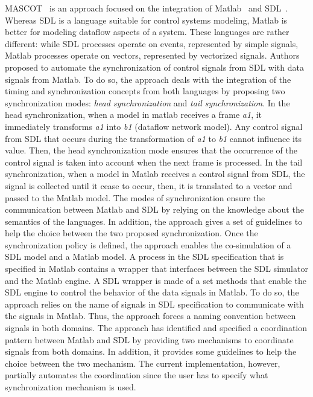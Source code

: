 MASCOT~\cite{mascotbib} is an approach focused on the integration of Matlab~\cite{matlabbib} and SDL~\cite{sdlbib}. Whereas SDL is a language suitable for control systems modeling, Matlab is better for modeling dataflow aspects of a system. These languages are rather different: while SDL processes operate on events, represented by simple signals, Matlab processes operate on vectors, represented by vectorized signals. Authors proposed to automate the synchronization of control signals from SDL with data signals from Matlab. To do so, the approach deals with the integration of the timing and synchronization concepts from both languages by proposing two synchronization modes: \emph{head synchronization} and \emph{tail synchronization}. In the head synchronization, when a model in matlab receives a frame \emph{a1}, it immediately transforms \emph{a1} into \emph{b1} (dataflow network model). Any control signal from SDL that occurs during the transformation of \emph{a1} to \emph{b1} cannot influence its value. Then, the head synchronization mode ensures that the occurrence of the control signal is taken into account when the next frame is processed. In the tail synchronization, when a model in Matlab receives a control signal from SDL, the signal is collected until it cease to occur, then, it is translated to a vector and passed to the Matlab model. The modes of synchronization ensure the communication between Matlab and SDL by relying on the knowledge about the semantics of the languages. In addition, the approach gives a set of guidelines to help the choice between the two proposed synchronization. Once the synchronization policy is defined, the approach enables the co-simulation of a SDL model and a Matlab model. A process in the SDL specification that is specified in Matlab contains a wrapper that interfaces between the SDL simulator and the Matlab engine. A SDL wrapper is made of a set methods that enable the SDL engine to control the behavior of the data signals in Matlab. To do so, the approach relies on the name of signals in SDL specification to communicate with the signals in Matlab. Thus, the approach forces a naming convention between signals in both domains. The approach has identified and specified a coordination pattern between Matlab and SDL by providing two mechanisms to coordinate signals from both domains. In addition, it provides some guidelines to help the choice between the two mechanism. The current implementation, however, partially automates the coordination since the user has to specify what synchronization mechanism is used.

